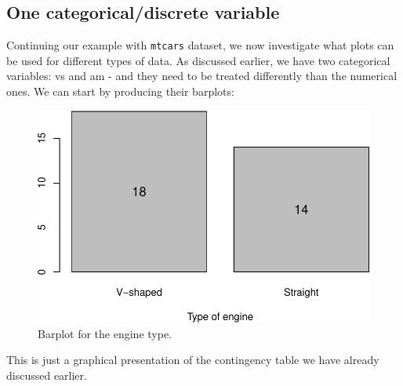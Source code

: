 \documentclass[
]{book}
\newenvironment{Shaded}{\begin{snugshade}}{\end{snugshade}}
\newcommand{\DataTypeTok}[1]{\textcolor[rgb]{0.13,0.29,0.53}{#1}}
\newcommand{\DecValTok}[1]{\textcolor[rgb]{0.00,0.00,0.81}{#1}}
\newcommand{\FloatTok}[1]{\textcolor[rgb]{0.00,0.00,0.81}{#1}}
\newcommand{\KeywordTok}[1]{\textcolor[rgb]{0.13,0.29,0.53}{\textbf{#1}}}
\newcommand{\NormalTok}[1]{#1}
\newcommand{\OperatorTok}[1]{\textcolor[rgb]{0.81,0.36,0.00}{\textbf{#1}}}
\newcommand{\StringTok}[1]{\textcolor[rgb]{0.31,0.60,0.02}{#1}}
\theoremstyle{definition}
\theoremstyle{definition}
\theoremstyle{definition}
\theoremstyle{definition}
\theoremstyle{remark}
\begin{document}
\hypertarget{one-categoricaldiscrete-variable}{%
\subsection{One categorical/discrete variable}\label{one-categoricaldiscrete-variable}}

Continuing our example with \texttt{mtcars} dataset, we now investigate what plots can be used for different types of data. As discussed earlier, we have two categorical variables: vs and am - and they need to be treated differently than the numerical ones. We can start by producing their barplots:

\begin{Shaded}
\end{Shaded}

\begin{figure}
\centering
\includegraphics{Svetunkov---Statistics-for-Business-Analytics_files/figure-latex/barplotVS-1.pdf}
\caption{\label{fig:barplotVS}Barplot for the engine type.}
\end{figure}

This is just a graphical presentation of the contingency table we have already discussed earlier.
\end{document}

